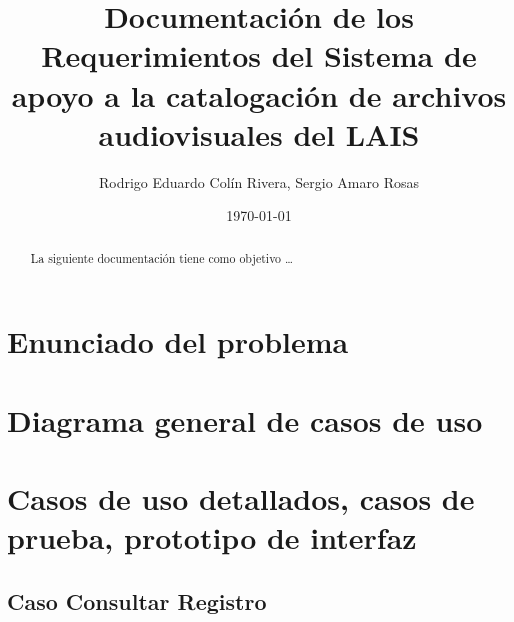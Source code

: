 \documentclass[10pt,letterpaper]{article}
\begin{document}
\title{Documentación de los Requerimientos del Sistema de apoyo a la catalogación de archivos audiovisuales del LAIS}
\author{Rodrigo Eduardo Colín Rivera, Sergio Amaro Rosas}
\date{\today}
\maketitle

\setcounter{secnumdepth}{0} %
\setcounter{tocdepth}{0} %
\graphicspath{{../Diagramas/}} %

\begin{abstract}
La siguiente documentación tiene como objetivo \ldots
\end{abstract}

\section{Enunciado del problema}

\section{Diagrama general de casos de uso}

\section{Casos de uso detallados, casos de prueba, prototipo de interfaz}
\subsection{Caso Consultar Registro}

\end{document}
